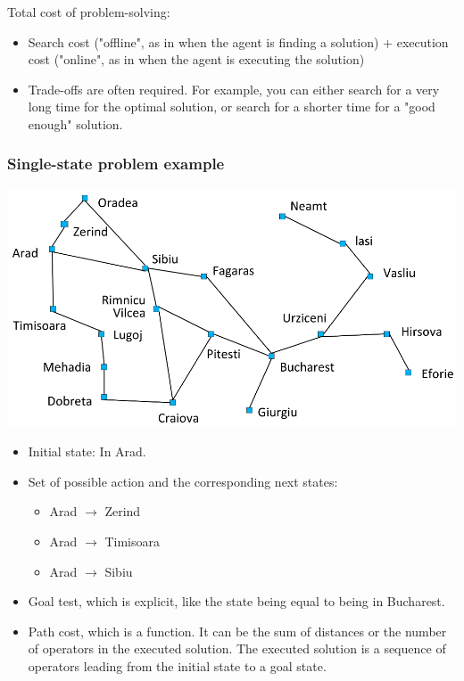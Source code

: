 \documentclass[11pt]{article}
\begin{document}
Total cost of problem-solving:
\begin{itemize}
\item Search cost ("offline", as in when the agent is finding a solution) + execution cost ("online", as in when the agent is executing the solution)
\item Trade-offs are often required. For example, you can either search for a very long time for the optimal solution, or search for a shorter time for a "good enough" solution.
\end{itemize}
\subsubsection{Single-state problem example}
\label{sec:org669acea}
\begin{center}
\includegraphics[width=.9\linewidth]{./images/romania-cities-diagram.png}
\end{center}

\begin{itemize}
\item Initial state: In Arad.
\item Set of possible action and the corresponding next states:
\begin{itemize}
\item Arad \(\rightarrow\) Zerind
\item Arad \(\rightarrow\) Timisoara
\item Arad \(\rightarrow\) Sibiu
\end{itemize}
\item Goal test, which is explicit, like the state being equal to being in Bucharest.
\item Path cost, which is a function. It can be the sum of distances or the number of operators in the executed solution. The executed solution is a sequence of operators leading from the initial state to a goal state.
\end{itemize}
\end{document}
